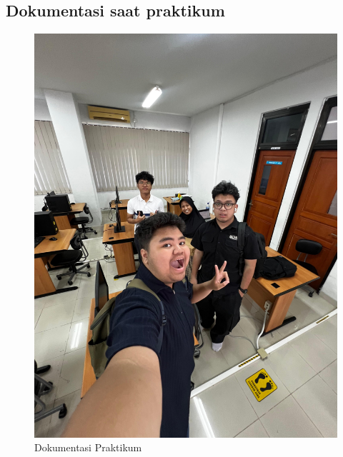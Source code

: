 \subsection{Dokumentasi saat praktikum}
\begin{figure}[htbp]
  \centering
  \includegraphics[width=.5\linewidth]{dokum/dokum.jpg}
  \caption{Dokumentasi Praktikum}
  \label{fig:dokum}
\end{figure}


